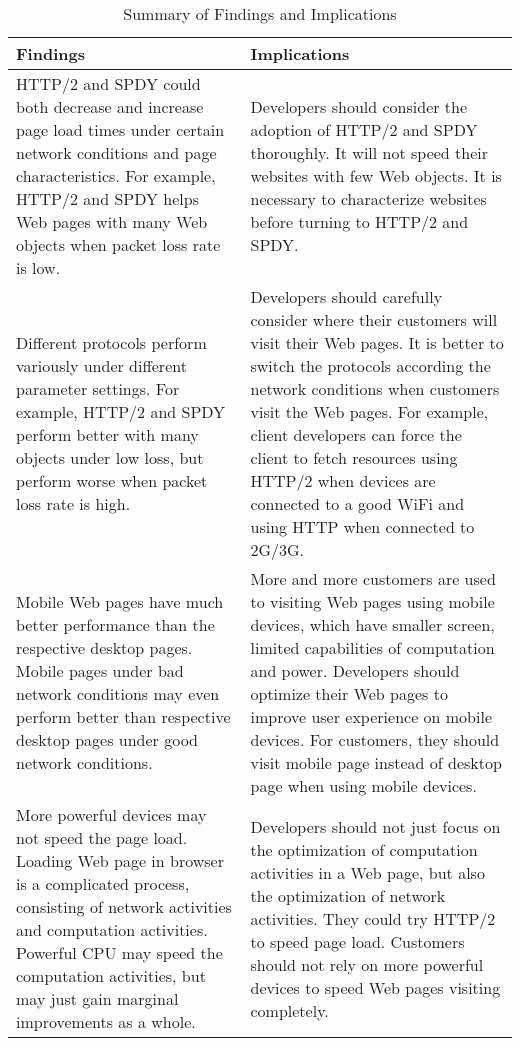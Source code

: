  \begin{table*}[htbp]\normalsize
\newcommand{\tabincell}[2]{\begin{tabular}{@{}#1@{}}#2\end{tabular}}
  \centering
  \caption{Summary of Findings and Implications}\label{tab:findings and implications}
  \begin{tabularx}
{\linewidth}{|X|X|}
\hline
    \rowcolor{mygray}\bfseries Findings & \bfseries Implications \\
\hline
HTTP/2 and SPDY could both decrease and increase page load times under certain network conditions and page characteristics. For example, HTTP/2 and SPDY helps Web pages with many Web objects when packet loss rate is low.
&
Developers should consider the adoption of HTTP/2 and SPDY thoroughly. It will not speed their websites with few Web objects. It is necessary to characterize websites before turning to HTTP/2 and SPDY.\\
\hline
Different protocols perform variously under different parameter settings. For example, HTTP/2 and SPDY perform better with many objects under low loss, but perform worse when packet loss rate is high.
&
Developers should carefully consider where their customers will visit their Web pages. It is better to switch the protocols according the network conditions when customers visit the Web pages. For example, client developers can force the client to fetch resources using HTTP/2 when devices are connected to a good WiFi and using HTTP when   connected to 2G/3G.
\\
\hline
Mobile Web pages have much better performance than the respective desktop pages. Mobile pages under bad network conditions may even perform better than respective desktop pages under good network conditions.
&
More and more customers are used to visiting Web pages using mobile devices, which have smaller screen, limited capabilities of computation and power. Developers should optimize their Web pages to improve user experience on mobile devices. For customers, they should visit mobile page instead of desktop page when using mobile devices.
\\
\hline
More powerful devices may not speed the page load. Loading Web page in browser is a complicated process, consisting of network activities and computation activities. Powerful CPU may speed the computation activities, but may just gain marginal improvements as a whole.
&
Developers should not just focus on the optimization of computation activities in a Web page, but also the optimization of network activities. They could try HTTP/2 to speed page load. Customers should not rely on more powerful devices to speed Web pages visiting completely.
\\
\hline
\end{tabularx}
\end{table*} 